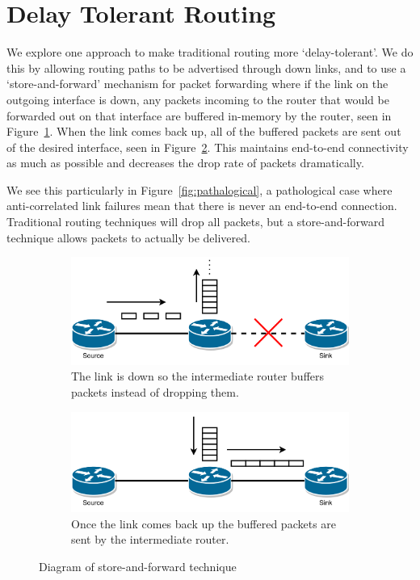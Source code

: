 \documentclass[withindex,glossary,openany]{cam-thesis}
\begin{document}
\section{Delay Tolerant Routing}
We explore one approach to make traditional routing more `delay-tolerant'. We do this by allowing routing paths to be advertised through down links, and to use a `store-and-forward' mechanism \cite{SAF} for packet forwarding where if the link on the outgoing interface is down, any packets incoming to the router that would be forwarded out on that interface are buffered in-memory by the router, seen in Figure~\ref{fig:saf_down}. When the link comes back up, all of the buffered packets are sent out of the desired interface, seen in Figure~\ref{fig:saf_up}. This maintains end-to-end connectivity as much as possible and decreases the drop rate of packets dramatically.

We see this particularly in Figure~\ref{fig:pathalogical}, a pathological case where anti-correlated link failures mean that there is never an end-to-end connection. Traditional routing techniques will drop all packets, but a store-and-forward technique allows packets to actually be delivered.

\begin{center}
\begin{minipage}{0.9\textwidth} \centering
\begin{figure}[H]
\centering
\begin{subfigure}{.65\textwidth}
  \centering
  \includegraphics[width=1\linewidth]{storeandforward_down}
  \caption{The link is down so the intermediate router buffers packets instead of dropping them.}
  \label{fig:saf_down}
\end{subfigure}
\begin{subfigure}{.65\textwidth}
  \centering
  \includegraphics[width=1\linewidth]{storeandforward_up}
  \caption{Once the link comes back up the buffered packets are sent by the intermediate router.}
  \label{fig:saf_up}
\end{subfigure}
\caption{Diagram of store-and-forward technique}
\label{fig:saf}
\end{figure}
\end{minipage}
\end{center}
\end{document}
